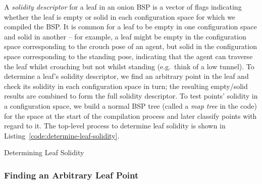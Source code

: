 \documentclass[10pt,twocolumn]{article}
\begin{document}
A \emph{solidity descriptor} for a leaf in an onion BSP is a vector of flags indicating whether the leaf is empty or solid in each configuration space for which we compiled the BSP. It is common for a leaf to be empty in one configuration space and solid in another -- for example, a leaf might be empty in the configuration space corresponding to the crouch pose of an agent, but solid in the configuration space corresponding to the standing pose, indicating that the agent can traverse the leaf whilst crouching but not whilst standing (e.g.~think of a low tunnel). To determine a leaf's solidity descriptor, we find an arbitrary point in the leaf and check its solidity in each configuration space in turn; the resulting empty/solid results are combined to form the full solidity descriptor. To test points' solidity in a configuration space, we build a normal BSP tree (called a \emph{map tree} in the code) for the space at the start of the compilation process and later classify points with regard to it. The top-level process to determine leaf solidity is shown in Listing~\ref{code:determine-leaf-solidity}.

\begin{stulisting}[!t]
\caption{Determining Leaf Solidity}
\label{code:determine-leaf-solidity}

\end{stulisting}

\subsubsection{Finding an Arbitrary Leaf Point}
\end{document}
